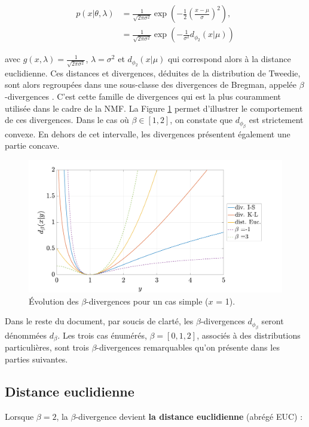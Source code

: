 \begin{align}
p(x \vert \theta, \lambda) & = \frac{1}{\sqrt{2 \pi \sigma^2}}\exp\left(-\frac{1}{2} \left(\frac{x-\mu}{\sigma} \right)^2 \right),\\
& = \frac{1}{\sqrt{2 \pi \sigma^2}}\exp\left(-\frac{1}{\sigma^2}  d_{\phi_{2}}(x\vert \mu) \right)
\end{align}

avec $g(x,\lambda) = \frac{1}{\sqrt{2 \pi \sigma^2}}$, $\lambda = \sigma^2$ et $d_{\phi_{2}}(x\vert \mu)$ qui correspond alors à la distance euclidienne. Ces distances et divergences, déduites de la distribution de Tweedie, sont alors regroupées dans une sous-classe des divergences de Bregman, appelée $\beta$-divergences \cite{hennequin_beta-divergence_2011}. C'est cette famille de divergences qui est la plus couramment utilisée dans le cadre de la NMF. La Figure \ref{fig:allure-divergence} permet d'illustrer le comportement de ces divergences. Dans le cas où $\beta \in \left[ 1,2 \right]$, on constate que $d_{\phi_{\beta}}$ est strictement convexe. En dehors de cet intervalle, les divergences présentent également une partie concave. \\

\begin{figure}[h]
\centering
\includegraphics[width=.7\textwidth]{./figures/NMF/betaDiv_exemple.pdf}
\caption{Évolution des $\beta$-divergences pour un cas simple ($x$ = 1).}
\label{fig:allure-divergence}
\end{figure}

Dans le reste du document, par soucis de clarté, les $\beta$-divergences $d_{\phi_{\beta}}$ seront dénommées $d_{\beta}$. Les trois cas énumérés, $\beta  = [0,1,2]$, associés à des distributions particulières, sont trois $\beta$-divergences remarquables qu'on présente dans les parties suivantes.

\subsection{Distance euclidienne}\label{part:dist_EUC}
Lorsque $\beta = 2$, la $\beta$-divergence devient \textbf{la distance euclidienne} (abrégé EUC) :


